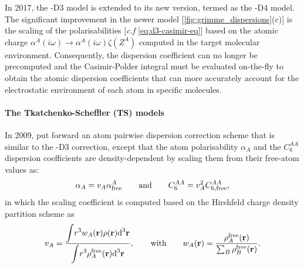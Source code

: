 In 2017, the -D3 model is extended to its new version, termed as the -D4 model.\cite{caldeweyher2017extension,caldeweyher2019generally} The significant improvement in the newer model [\cref{fig:grimme_dispersions}(c)] is the scaling of the polarisabilities [\emph{c.f} \cref{eq:d3-casimir-eq}] based on the atomic charge $\alpha^{A}(i\omega)\to\alpha^{A}(i\omega)\zeta(Z^A)$ computed in the target molecular environment. Consequently, the dispersion coefficient can no longer be precomputed and the Casimir-Polder integral must be evaluated on-the-fly to obtain the atomic dispersion coefficients that can more accurately account for the electrostatic environment of each atom in specific molecules.

\paragraph{\textbf{The Tkatchenko-Scheffler (TS) models}} In 2009, \citet{tkatchenko2009accurate} put forward an atom pairwise dispersion correction scheme that is similar to the -D3 correction, except that the atom polarisability $\alpha_A$ and the $C_6^{AA}$ dispersion coefficients are density-dependent by scaling them from their free-atom values as:
\begin{equation}\label{eq:TS_pol_scaling}
    \alpha_A=v_A\alpha_{\mbox{\scriptsize{free}}}^A\qquad\mbox{and}\qquad C_6^{AA}=v_A^2C_{6,{\mbox{\scriptsize{free}}}}^{AA},
\end{equation}
in which the scaling coefficient is computed based on the Hirshfeld charge density partition scheme\cite{hirshfeld1977bonded} as
\begin{equation}\label{eq:hirshfeld}
v_A=\frac{\displaystyle{\int} r^3 w_A(\mathbf{r})\rho(\mathbf{r})\mbox{d}^3\mathbf{r}}{\displaystyle{\int} r^3 \rho^{\mbox{\scriptsize{free}}}_{A}(\mathbf{r})\mbox{d}^3\mathbf{r}}, \qquad \mbox{with}\qquad w_A(\mathbf{r})=\frac{\rho^{\mbox{\scriptsize{free}}}_{A}(\mathbf{r})}{\sum_B \rho^{\mbox{\scriptsize{free}}}_{B}(\mathbf{r})}.
\end{equation}

